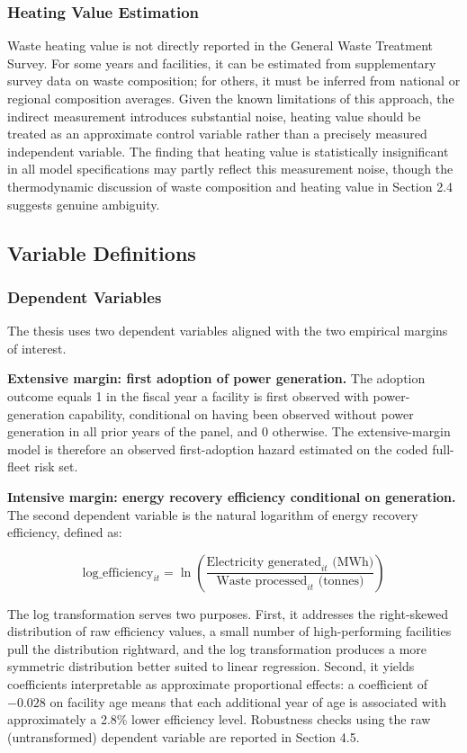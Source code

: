 \documentclass[12pt,a4paper]{article}
\begin{document}
\subsubsection{Heating Value Estimation}

Waste heating value is not directly reported in the General Waste Treatment Survey. For some years and facilities, it can be estimated from supplementary survey data on waste composition; for others, it must be inferred from national or regional composition averages. Given the known limitations of this approach, the indirect measurement introduces substantial noise, heating value should be treated as an approximate control variable rather than a precisely measured independent variable. The finding that heating value is statistically insignificant in all model specifications may partly reflect this measurement noise, though the thermodynamic discussion of waste composition and heating value in Section 2.4 suggests genuine ambiguity.

\subsection{Variable Definitions}

\subsubsection{Dependent Variables}

The thesis uses two dependent variables aligned with the two empirical margins of interest.

\textbf{Extensive margin: first adoption of power generation.} The adoption outcome equals 1 in the fiscal year a facility is first observed with power-generation capability, conditional on having been observed without power generation in all prior years of the panel, and 0 otherwise. The extensive-margin model is therefore an observed first-adoption hazard estimated on the coded full-fleet risk set.

\textbf{Intensive margin: energy recovery efficiency conditional on generation.} The second dependent variable is the natural logarithm of energy recovery efficiency, defined as:

\begin{equation}
\text{log\_efficiency}_{it} = \ln\!\left(\frac{\text{Electricity generated}_{it} \text{ (MWh)}}{\text{Waste processed}_{it} \text{ (tonnes)}}\right)
\end{equation}

The log transformation serves two purposes. First, it addresses the right-skewed distribution of raw efficiency values, a small number of high-performing facilities pull the distribution rightward, and the log transformation produces a more symmetric distribution better suited to linear regression. Second, it yields coefficients interpretable as approximate proportional effects: a coefficient of $-0.028$ on facility age means that each additional year of age is associated with approximately a 2.8\% lower efficiency level. Robustness checks using the raw (untransformed) dependent variable are reported in Section 4.5.
\end{document}

